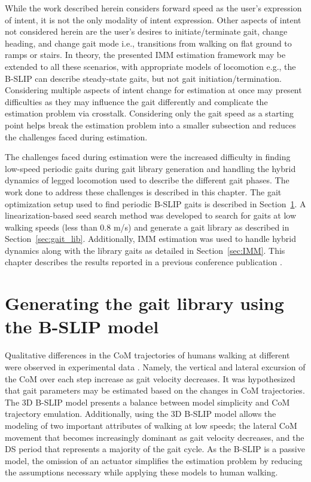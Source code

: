 While the work described herein considers forward speed as the user's expression of intent, it is not the only modality of intent expression. Other aspects of intent not considered herein are the user's desires to initiate/terminate gait, change heading, and change gait mode i.e., transitions from walking on flat ground to ramps or stairs. In theory, the presented IMM estimation framework may be extended to all these scenarios, with appropriate models of locomotion e.g., the B-SLIP can describe steady-state gaits, but not gait initiation/termination. Considering multiple aspects of intent change for estimation at once may present difficulties as they may influence the gait differently and complicate the estimation problem via crosstalk. Considering only the gait speed as a starting point helps break the estimation problem into a smaller subsection and reduces the challenges faced during estimation.

The challenges faced during estimation were the increased difficulty in finding low-speed periodic gaits during gait library generation and handling the hybrid dynamics of legged locomotion used to describe the different gait phases. The work done to address these challenges is described in this chapter. The gait optimization setup used to find periodic B-SLIP gaits is described in Section~\ref{sec:gait_opt}. A linearization-based seed search method was developed to search for gaits at low walking speeds (less than 0.8 m/s) and generate a gait library as described in Section~\ref{sec:gait_lib}. Additionally, IMM estimation was used to handle hybrid dynamics along with the library gaits as detailed in Section~\ref{sec:IMM}. This chapter describes the results reported in a previous conference publication \cite{karulkarapplication}.

\section{Generating the gait library using the B-SLIP model} \label{sec:gait_opt}

Qualitative differences in the CoM trajectories of humans walking at different were observed in experimental data \cite{fukuchi2018public}. Namely, the vertical and lateral excursion of the CoM over each step increase as gait velocity decreases. It was hypothesized that gait parameters may be estimated based on the changes in CoM trajectories. The 3D B-SLIP model presents a balance between model simplicity and CoM trajectory emulation. Additionally, using the 3D B-SLIP model allows the modeling of two important attributes of walking at low speeds; the lateral CoM movement that becomes increasingly dominant as gait velocity decreases, and the DS period that represents a majority of the gait cycle. As the B-SLIP is a passive model, the omission of an actuator simplifies the estimation problem by reducing the assumptions necessary while applying these models to human walking. 

